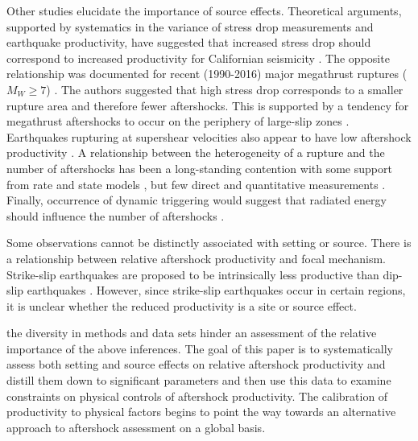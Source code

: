 \documentclass[draft, jgrga]{agujournal2018}
\begin{document}
Other studies elucidate the importance of source effects. Theoretical arguments, supported by systematics in the variance of stress drop measurements and earthquake productivity, have suggested that increased stress drop should correspond to increased productivity for Californian seismicity \citep{Marsan2017HowAftershocks}. The opposite relationship was documented for recent (1990-2016) major megathrust ruptures ($M_W \ge 7$) \citep{Wetzler2016}. The authors suggested that high stress drop corresponds to a smaller rupture area and therefore fewer aftershocks. This is supported by a tendency for megathrust aftershocks to occur on the periphery of large-slip zones \citep{Wetzler2016}. Earthquakes rupturing at supershear velocities also appear to have low aftershock productivity \citep{Bouchon2008TheEarthquakes}. A relationship between the heterogeneity of a rupture and the number of aftershocks has been a long-standing contention \citep{Mogi1967, Yamanaka1990scalingshock} with some support from rate and state models \citep{Helmstetter2006RelationModel, Marsan2006}, but few direct and quantitative measurements \citep{Das2003SpatialDistribution, Houston2004}. Finally, occurrence of dynamic triggering would suggest that radiated energy should influence the number of aftershocks \citep{felzer2006decay}.

Some observations cannot be distinctly associated with setting or source. There is a relationship between relative aftershock productivity and focal mechanism. Strike-slip earthquakes are proposed to be intrinsically less productive than dip-slip earthquakes \citep{Tahir2012, Tahir2014Aftershock2005, Tahir2015}. However, since strike-slip earthquakes occur in certain regions, it is unclear whether the reduced productivity is a site or source effect.

 the diversity in methods and data sets hinder an assessment of the relative importance of the above inferences. The goal of this paper is to systematically assess both setting and source effects on relative aftershock productivity and distill them down to significant parameters and then use this data to examine constraints on physical controls of aftershock productivity.  The calibration of productivity to physical factors begins to point the way towards an alternative approach to aftershock assessment on a global basis.
\end{document}
